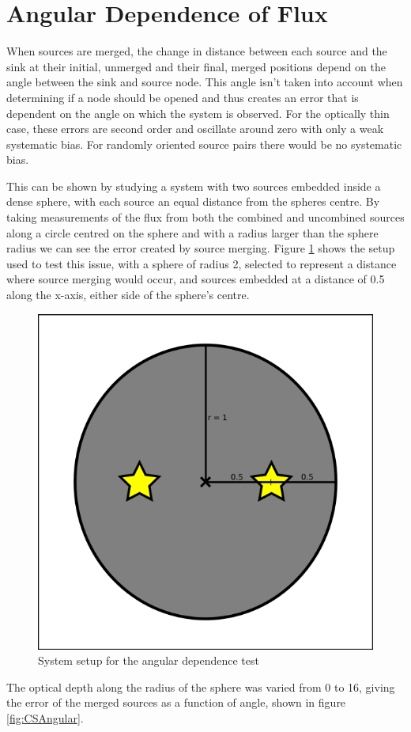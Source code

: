 \section{Angular Dependence of Flux}
When sources are merged, the change in distance between each source and the sink at their initial, unmerged and their final, merged positions depend on the angle between the sink and source  node. This angle isn't taken into account when determining if a node should be opened and thus creates an error that is dependent on the angle on which the system is observed. For the optically thin case, these errors are second order and oscillate around zero with only a weak systematic bias. For randomly oriented source pairs there would be no systematic bias.

This can be shown by studying a system with two sources embedded inside a dense sphere, with each source an equal distance from the spheres centre. By taking measurements of the flux from both the combined and uncombined sources along a circle centred on the sphere and with a radius larger than the sphere radius we can see the error created by source merging. Figure \ref{fig:CSIC} shows the setup used to test this issue, with a sphere of radius 2, selected to represent a distance where source merging would occur, and sources embedded at a distance of 0.5 along the x-axis, either side of the sphere's centre. 
\begin{figure} [H]
    \centering
    \includegraphics[width=\textwidth]{plots/CH4/CSICs.png}
    \caption{System setup for the angular dependence test}
    \label{fig:CSIC}
\end{figure}
The optical depth along the radius of the sphere was varied from 0 to 16, giving the error of the merged sources as a function of angle, shown in figure \ref{fig:CSAngular}.

